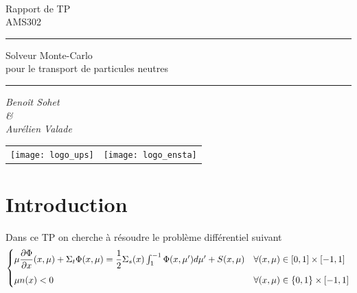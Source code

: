 \message{ !name(rapport_monte_carlo.tex)}\documentclass[12pt,a4paper]{article}
\newcommand{\dx}[1]{\dfrac{\partial #1}{\partial x}}
\begin{document}


\begin{titlepage}
  ~\vspace{90pt}
  \centering \bfseries

  \huge Rapport de TP \\AMS302

  \vspace{50pt}
  \rule{0.5\textwidth}{1pt}
  \vspace{50pt}

  \Huge Solveur Monte-Carlo \\ pour le transport de particules neutres

  \vspace{50pt}
  \rule{0.5\textwidth}{1pt}

  \vspace{50pt}
  \huge {\itshape Benoît Sohet \\ \& \\ Aurélien Valade}

  \vfill
  \begin{tabular}{cc}
    \begin{minipage}{.49\textwidth}
      \centering
      \texttt{[image: logo\_ups]}
    \end{minipage}
    &
      \begin{minipage}{.49\textwidth}
        \centering
        \texttt{[image: logo\_ensta]}
      \end{minipage}
  \end{tabular}

\end{titlepage}

\newpage

\section{Introduction}

Dans ce TP on cherche à résoudre le problème différentiel suivant 
\begin{equation}
  \label{eq:principal}
  \begin{cases}
    \mu \dx{\Phi}(x, \mu) + \Sigma_t \Phi(x, \mu) =
    \dfrac{1}{2} \Sigma_s(x) \int_1^{-1} \Phi(x, \mu') d\mu' + S(x, \mu) & \forall (x, \mu) \in [0,1]\times[-1,1]  \medskip\\ 
    \mu n(x) < 0  & \forall (x, \mu) \in \{0,1\}\times[-1,1] 
  \end{cases}
\end{equation}
\end{document}
